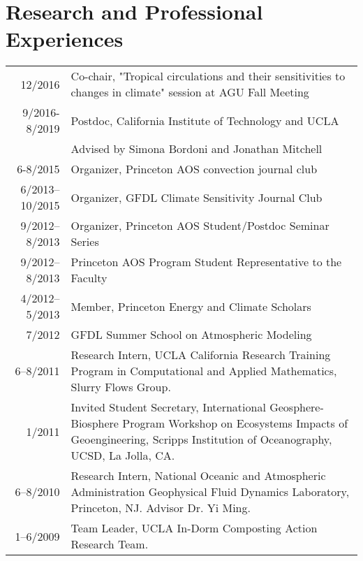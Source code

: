 \documentclass{article}
\begin{document}
\section*{Research and Professional Experiences}
\label{sec:orgheadline9}
\begin{center}
\begin{tabularx}{\textwidth}{rX}
12/2016 & Co-chair, "Tropical circulations and their sensitivities to changes in climate" session at AGU Fall Meeting\\
9/2016-8/2019 & Postdoc, California Institute of Technology and UCLA\\
 & Advised by Simona Bordoni and Jonathan Mitchell\\
6-8/2015 & Organizer, Princeton AOS convection journal club\\
6/2013–10/2015 & Organizer, GFDL Climate Sensitivity Journal Club\\
9/2012–8/2013 & Organizer, Princeton AOS Student/Postdoc Seminar Series\\
9/2012–8/2013 & Princeton AOS Program Student Representative to the Faculty\\
4/2012–5/2013 & Member, Princeton Energy and Climate Scholars\\
7/2012 & GFDL Summer School on Atmospheric Modeling\\
6–8/2011 & Research Intern, UCLA California Research Training Program in Computational and Applied Mathematics, Slurry Flows Group.\\
1/2011 & Invited Student Secretary, International Geosphere-Biosphere Program Workshop on Ecosystems Impacts of Geoengineering, Scripps Institution of Oceanography, UCSD, La Jolla, CA.\\
6–8/2010 & Research Intern, National Oceanic and Atmospheric Administration Geophysical Fluid Dynamics Laboratory, Princeton, NJ. Advisor Dr. Yi Ming.\\
1–6/2009 & Team Leader, UCLA In-Dorm Composting Action Research Team.\\
\end{tabularx}
\end{center}
\end{document}
